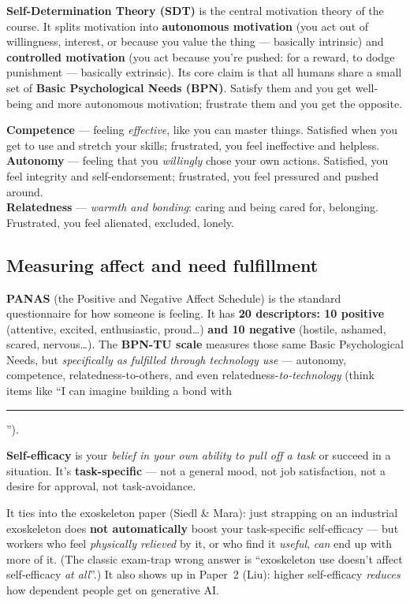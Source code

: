 \documentclass[11pt, oneside]{book}
\begin{document}
\textbf{Self-Determination Theory (SDT)} is the central motivation theory of
the course. It splits motivation into \textbf{autonomous motivation} (you act
out of willingness, interest, or because you value the thing — basically
intrinsic) and \textbf{controlled motivation} (you act because you're pushed:
for a reward, to dodge punishment — basically extrinsic). Its core claim is
that all humans share a small set of \textbf{Basic Psychological Needs
(BPN)}. Satisfy them and you get well-being and more autonomous motivation;
frustrate them and you get the opposite.

\begin{thmbox}[title={The three Basic Psychological Needs (SDT) — memorize these}]
\textbf{Competence} — feeling \emph{effective}, like you can master things.
Satisfied when you get to use and stretch your skills; frustrated, you feel
ineffective and helpless.\\
\textbf{Autonomy} — feeling that you \emph{willingly} chose your own actions.
Satisfied, you feel integrity and self-endorsement; frustrated, you feel
pressured and pushed around.\\
\textbf{Relatedness} — \emph{warmth and bonding}: caring and being cared for,
belonging. Frustrated, you feel alienated, excluded, lonely.
\end{thmbox}

\subsection{Measuring affect and need fulfillment}

\textbf{PANAS} (the Positive and Negative Affect Schedule) is the standard
questionnaire for how someone is feeling. It has \textbf{20 descriptors: 10
positive} (attentive, excited, enthusiastic, proud\ldots) \textbf{and 10
negative} (hostile, ashamed, scared, nervous\ldots). The \textbf{BPN-TU
scale} measures those same Basic Psychological Needs, but \emph{specifically
as fulfilled through technology use} — autonomy, competence,
relatedness-to-others, and even relatedness-\emph{to-technology} (think items
like ``I can imagine building a bond with \rule{0.6cm}{0.4pt}'').

\begin{defbox}[title={Self-efficacy — this one comes up a lot}]
\textbf{Self-efficacy} is your \emph{belief in your own ability to pull off a
task} or succeed in a situation. It's \textbf{task-specific} — not a general
mood, not job satisfaction, not a desire for approval, not task-avoidance.

It ties into the exoskeleton paper (Siedl \& Mara): just strapping on an
industrial exoskeleton does \textbf{not automatically} boost your
task-specific self-efficacy — but workers who feel \emph{physically relieved}
by it, or who find it \emph{useful}, \emph{can} end up with more of it. (The
classic exam-trap wrong answer is ``exoskeleton use doesn't affect
self-efficacy \emph{at all}''.) It also shows up in Paper~2 (Liu): higher
self-efficacy \emph{reduces} how dependent people get on generative AI.
\end{defbox}
\end{document}

